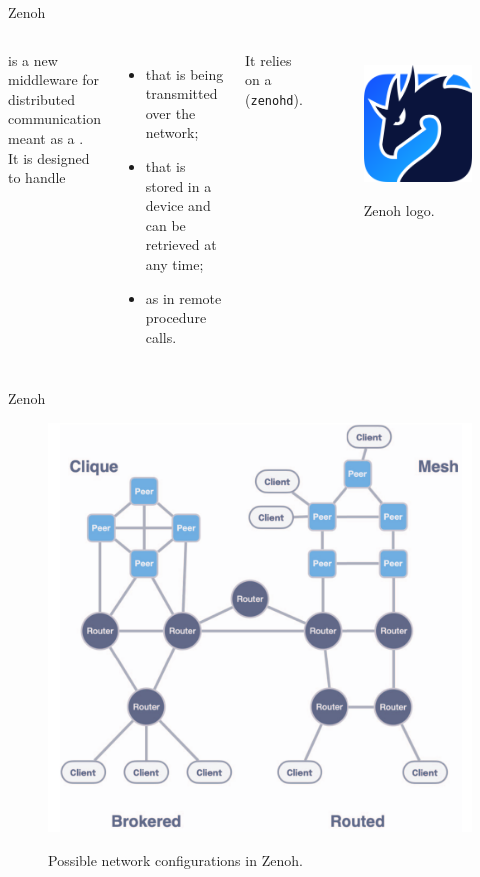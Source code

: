 \begin{frame}{Zenoh}
  \begin{columns}
     is a new middleware for distributed communication meant as a .\\
    It is designed to handle 
    \begin{itemize}
        \item {} that is being transmitted over the network;
        \item {} that is stored in a device and can be retrieved at any time;
        \item {} as in remote procedure calls.
    \end{itemize}
    It relies on a  (\texttt{zenohd}).

    \begin{figure}
      \centering
      \includegraphics[width=.65\textwidth]{zenoh}
      \label{fig:zenoh}
      \caption{Zenoh logo.}
    \end{figure}
  \end{columns}
\end{frame}
\begin{frame}{Zenoh}
\begin{figure}
      \centering
      \includegraphics[width=.45\textwidth]{zenoh_networks}
      \label{fig:zenohnets}
      \caption{Possible network configurations in Zenoh.}
    \end{figure}
\end{frame}
